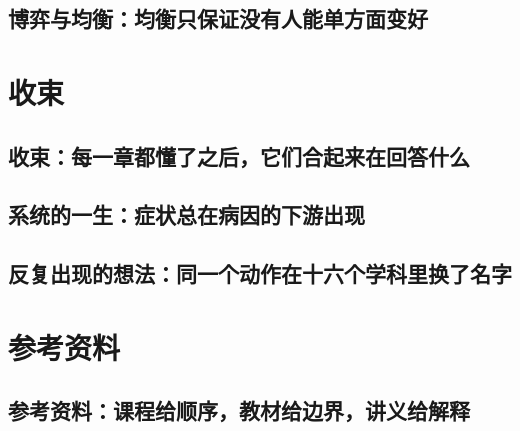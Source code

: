 \documentclass[UTF8,openany]{ctexbook}
\theoremstyle{definition}
\theoremstyle{plain}
\begin{document}
\chapter*{博弈与均衡：均衡只保证没有人能单方面变好}
\label{ch:146}





\clearpage
\part{收束}
\chapter*{收束：每一章都懂了之后，它们合起来在回答什么}
\label{ch:147}

\clearpage
\chapter*{系统的一生：症状总在病因的下游出现}
\label{ch:148}







\clearpage
\chapter*{反复出现的想法：同一个动作在十六个学科里换了名字}
\label{ch:149}






\clearpage
\part{参考资料}
\chapter*{参考资料：课程给顺序，教材给边界，讲义给解释}
\label{ch:150}

\clearpage
\end{document}
